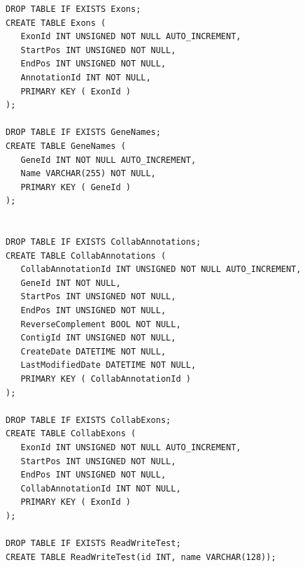 \documentclass[12pt]{ucthesis}
\begin{document}
\begin{verbatim}
DROP TABLE IF EXISTS Exons;
CREATE TABLE Exons (
   ExonId INT UNSIGNED NOT NULL AUTO_INCREMENT,
   StartPos INT UNSIGNED NOT NULL,
   EndPos INT UNSIGNED NOT NULL,
   AnnotationId INT NOT NULL,
   PRIMARY KEY ( ExonId )
);

DROP TABLE IF EXISTS GeneNames;
CREATE TABLE GeneNames (
   GeneId INT NOT NULL AUTO_INCREMENT,
   Name VARCHAR(255) NOT NULL,
   PRIMARY KEY ( GeneId )
);


DROP TABLE IF EXISTS CollabAnnotations;
CREATE TABLE CollabAnnotations (
   CollabAnnotationId INT UNSIGNED NOT NULL AUTO_INCREMENT,
   GeneId INT NOT NULL,
   StartPos INT UNSIGNED NOT NULL,
   EndPos INT UNSIGNED NOT NULL,
   ReverseComplement BOOL NOT NULL,  
   ContigId INT UNSIGNED NOT NULL,
   CreateDate DATETIME NOT NULL,
   LastModifiedDate DATETIME NOT NULL,
   PRIMARY KEY ( CollabAnnotationId )
);

DROP TABLE IF EXISTS CollabExons;
CREATE TABLE CollabExons (
   ExonId INT UNSIGNED NOT NULL AUTO_INCREMENT,
   StartPos INT UNSIGNED NOT NULL,
   EndPos INT UNSIGNED NOT NULL,
   CollabAnnotationId INT NOT NULL,
   PRIMARY KEY ( ExonId )
);

DROP TABLE IF EXISTS ReadWriteTest;
CREATE TABLE ReadWriteTest(id INT, name VARCHAR(128));
\end{verbatim}
\end{document}

